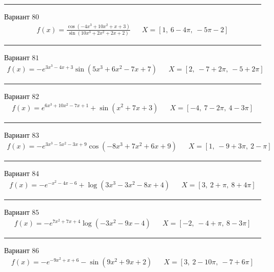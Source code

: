 \documentclass[11pt]{report}
\begin{document}
\begin{center}
    \noindent\rule{8cm}{0.4pt}
\end{center}
Вариант \(80\)
\begin{align*}
    f(x) = \frac{\cos{\left(- 4 x^{3} + 10 x^{2} + x + 3 \right)}}{\sin{\left(10 x^{3} + 2 x^{2} + 2 x + 2 \right)}} && X = \left[ 1, \  6 - 4 \pi, \  - 5 \pi - 2\right]
\end{align*}
\begin{center}
    \noindent\rule{8cm}{0.4pt}
\end{center}
Вариант \(81\)
\begin{align*}
    f(x) = - e^{3 x^{3} - 4 x + 3} \sin{\left(5 x^{3} + 6 x^{2} - 7 x + 7 \right)} && X = \left[ 2, \  -7 + 2 \pi, \  -5 + 2 \pi\right]
\end{align*}
\begin{center}
    \noindent\rule{8cm}{0.4pt}
\end{center}
Вариант \(82\)
\begin{align*}
    f(x) = e^{6 x^{3} + 10 x^{2} - 7 x + 1} + \sin{\left(x^{2} + 7 x + 3 \right)} && X = \left[ -4, \  7 - 2 \pi, \  4 - 3 \pi\right]
\end{align*}
\begin{center}
    \noindent\rule{8cm}{0.4pt}
\end{center}
Вариант \(83\)
\begin{align*}
    f(x) = - e^{3 x^{3} - 5 x^{2} - 3 x + 9} \cos{\left(- 8 x^{3} + 7 x^{2} + 6 x + 9 \right)} && X = \left[ 1, \  -9 + 3 \pi, \  2 - \pi\right]
\end{align*}
\begin{center}
    \noindent\rule{8cm}{0.4pt}
\end{center}
Вариант \(84\)
\begin{align*}
    f(x) = - e^{- x^{2} - 4 x - 6} + \log{\left(3 x^{3} - 3 x^{2} - 8 x + 4 \right)} && X = \left[ 3, \  2 + \pi, \  8 + 4 \pi\right]
\end{align*}
\begin{center}
    \noindent\rule{8cm}{0.4pt}
\end{center}
Вариант \(85\)
\begin{align*}
    f(x) = - e^{7 x^{2} + 7 x + 4} \log{\left(- 3 x^{2} - 9 x - 4 \right)} && X = \left[ -2, \  -4 + \pi, \  8 - 3 \pi\right]
\end{align*}
\begin{center}
    \noindent\rule{8cm}{0.4pt}
\end{center}
Вариант \(86\)
\begin{align*}
    f(x) = - e^{- 9 x^{2} + x + 6} - \sin{\left(9 x^{2} + 9 x + 2 \right)} && X = \left[ 3, \  2 - 10 \pi, \  -7 + 6 \pi\right]
\end{align*}
\end{document}
